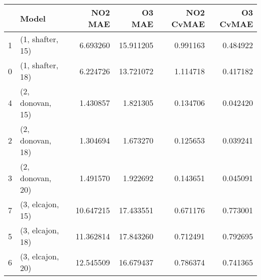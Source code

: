 \begin{tabular}{llrrrr}
\toprule
{} &             Model &    NO2 MAE &     O3 MAE &  NO2 CvMAE &  O3 CvMAE \\
\midrule
1 &  (1, shafter, 15) &   6.693260 &  15.911205 &   0.991163 &  0.484922 \\
0 &  (1, shafter, 18) &   6.224726 &  13.721072 &   1.114718 &  0.417182 \\
4 &  (2, donovan, 15) &   1.430857 &   1.821305 &   0.134706 &  0.042420 \\
2 &  (2, donovan, 18) &   1.304694 &   1.673270 &   0.125653 &  0.039241 \\
3 &  (2, donovan, 20) &   1.491570 &   1.922692 &   0.143651 &  0.045091 \\
7 &  (3, elcajon, 15) &  10.647215 &  17.433551 &   0.671176 &  0.773001 \\
5 &  (3, elcajon, 18) &  11.362814 &  17.843260 &   0.712491 &  0.792695 \\
6 &  (3, elcajon, 20) &  12.545509 &  16.679437 &   0.786374 &  0.741365 \\
\bottomrule
\end{tabular}
